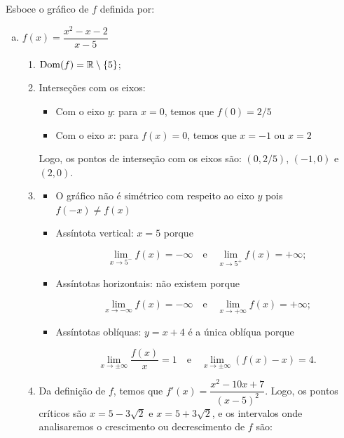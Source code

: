 \cleardoublepage\documentclass[../main.tex]{subfiles}
\begin{document}
\begin{ex}
Esboce o gráfico de \(f\) definida por:

\begin{enumerate}[a)]
\item \(f(x)=\dfrac{x^2-x-2}{x-5}\)

\begin{solution}
\begin{enumerate}[1.]
\item \({\rm Dom}(f)=\mathbb{R}\setminus\{5\}\);
\item Interseções com os eixos:
\begin{itemize}
    \item Com o eixo \(y\): para \(x=0\), temos que \(f(0)=2/5\)
\item Com o eixo \(x\): para \(f(x)=0\), temos que \(x=-1\) ou \(x=2\)
\end{itemize}
Logo, os pontos de interseção com os eixos são: \((0,2/5)\), \((-1,0)\) e \( (2,0)\).
\item 
\begin{itemize}
    \item O gráfico não é simétrico com respeito ao eixo \(y\) pois \(f(-x)\neq f(x)\)

\item Assíntota vertical: \(x=5\) porque

\[ \lim\limits_{x\to 5^-}f(x)=-\infty\quad \mbox{e}\quad \lim\limits_{x\to 5^+}f(x)=+\infty; \]
\item Assíntotas horizontais: não existem porque

\[ \lim\limits_{x\to-\infty}f(x)=-\infty\quad \mbox{e}\quad \lim\limits_{x\to+\infty}f(x)=+\infty; \]
\item Assíntotas oblíquas: \(y=x+4\) é a única oblíqua porque

\[ \lim\limits_{x\to \pm\infty}\dfrac{f(x)}{x}=1\quad \mbox{e}\quad \lim\limits_{x\to\pm\infty}(f(x)-x)=4. \]
\end{itemize}
\item Da definição de \(f\), temos que \(f'(x)= \dfrac{x^2-10x+7}{(x-5)^2}\).
Logo, os pontos críticos são \(x=5-3\sqrt{2}\) e \(x=5+3\sqrt{2}\), e os intervalos onde analisaremos o crescimento ou decrescimento de \(f\) são:


\end{enumerate}
\end{solution}
\end{enumerate}
\end{ex}
\end{document}
